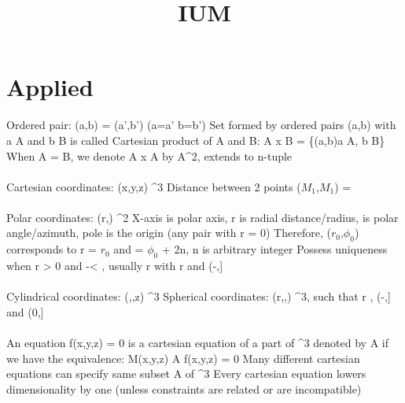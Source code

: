 \documentclass{article}
\begin{document}
\title{IUM}

\maketitle

\tableofcontents

\section{Applied}

Ordered pair: \math (a,b) = (a',b') \Leftrightarrow (a=a' \wedge b=b')\)
\newline Set formed by ordered pairs \math (a,b)\) with a \in A\) and b \in B\) is called Cartesian product of A and B: A x B = \math \{(a,b)\vert a \in A, b \in B\}\)
\newline When A = B, we denote A x A by A^2\), extends to n-tuple
\\
\\
Cartesian coordinates: \math(x,y,z) \in \Re^3\)
\newline Distance between 2 points \math \triangle ($M_1$,$M_1$) = \)
\\
\\
Polar coordinates: \math(r,\phi) \in \Re^2\)
\newline X-axis is polar axis, r is radial distance/radius, \phi\) is polar angle/azimuth, pole is the origin (any pair with r = 0)
\newline Therefore, ($r_0$,$\phi_0$) corresponds to r = $r_0$ and \phi = $\phi_0$ + 2n\pi\), n is arbitrary integer
\newline Possess uniqueness when \math r > 0\) and -\pi < \phi \leq \pi\), usually r \geq{} with r \in \Re\) and \phi \in (-\pi,\pi]\)
\\
\\
Cylindrical coordinates: \math(\rho,\phi,z) \in \Re^3\)
\newline Spherical coordinates: \math(r,\phi,\theta) \in \Re^3\), such that r , \phi \in (-\pi,\pi]\) and \theta \in (0,\pi]\)
\\
\\
An equation \math f(x,y,z) = 0\) is a cartesian equation of a part of \Re^3\) denoted by A if we have the equivalence: \math M(x,y,z) \in A \Leftrightarrow f(x,y,z) = 0 \)
\newline Many different cartesian equations can specify same subset A of \Re^3\)
\newline Every cartesian equation lowers dimensionality by one (unless constraints are related or are incompatible)
\end{document}
